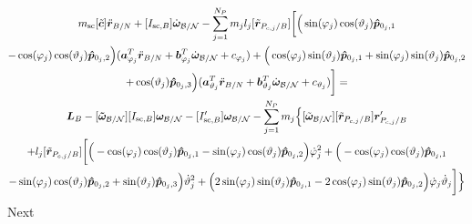 \begin{multline}
	m_{\text{sc}}[\tilde{\bm{c}}]\ddot{\bm r}_{B/N}+[I_{\text{sc},B}] \dot{\bm\omega}_{\cal B/N}  - \sum\limits_{j=1}^{N_P}m_j l_j [\tilde{\bm{r}}_{P_{c,j}/B}] \bigg[
	\Big(\sin(\varphi_j)\cos(\vartheta_j)\bm{\hat{p}}_{0_j,1}\\-\cos(\varphi_j)\cos(\vartheta_j)\bm{\hat{p}}_{0_j,2}\Big)(\bm a_{\varphi_j}^T \ddot{\bm{r}}_{B/N} + \bm b_{\varphi_j}^T \dot{\bm\omega}_{\cal B/N}+c_{\varphi_j}) 
	+\Big(\cos(\varphi_j)\sin(\vartheta_j)\bm{\hat{p}}_{0_j,1}+\sin(\varphi_j)\sin(\vartheta_j)\bm{\hat{p}}_{0_j,2}\\+\cos(\vartheta_j)\bm{\hat{p}}_{0_j,3} \Big)(\bm a_{\vartheta_j}^T \ddot{\bm r}_{B/N} + \bm b_{\vartheta_j}^T \dot{\bm\omega}_{\cal B/N} + c_{\vartheta_j})
	\bigg] = \\
	\bm{L}_B-[\bm{\tilde{\omega}}_{\cal B/N}] [I_{\text{sc},B}] \bm\omega_{\cal B/N}
	- [I'_{\text{sc},B}] \bm\omega_{\cal B/N}- \sum\limits_{j=1}^{N_P} m_j \Big\{[\tilde{\bm\omega}_{\cal B/N}] [\tilde{\bm{r}}_{P_{c,j}/B}] \bm{r}'_{P_{c,j}/B}\\
	+l_j[\tilde{\bm{r}}_{P_{c,j}/B}]\bigg[
	\Big(-\cos(\varphi_j)\cos(\vartheta_j)\bm{\hat{p}}_{0_j,1}-\sin(\varphi_j)\cos(\vartheta_j)\bm{\hat{p}}_{0_j,2}\Big)\dot{\varphi}_j^2
	+\Big(-\cos(\varphi_j)\cos(\vartheta_j)\bm{\hat{p}}_{0_j,1}\\-\sin(\varphi_j)\cos(\vartheta_j)\bm{\hat{p}}_{0_j,2}+\sin(\vartheta_j)\bm{\hat{p}}_{0_j,3} \Big)\dot{\vartheta}_j^2 +
	\Big(2\sin(\varphi_j)\sin(\vartheta_j)\bm{\hat{p}}_{0_j,1} -2\cos(\varphi_j)\sin(\vartheta_j)\bm{\hat{p}}_{0_j,2}\Big)\dot{\varphi}_j\dot{\vartheta}_j
	\bigg]\Big\}
	\label{eq:Final6_1}
\end{multline}
Next

